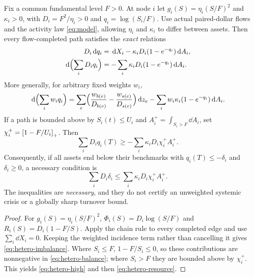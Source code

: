 \documentclass[review,hidelinks,onefignum,onetabnum]{siamonline250211}%
\begin{document}
\begin{proposition}
\label{prop:hetero-weighted}
Fix a common fundamental level $F>0$. At node $i$ let
$g_i(S)=\eta_i(S/F)^2$ and $\kappa_i>0$, with
$D_i=F^2/\eta_i>0$ and $q_i=\log(S_i/F)$. Use actual paired-dollar
flows and the activity law \eqref{eq:model}, allowing $\eta_i$ and
$\kappa_i$ to differ between assets. Then every flow-completed path
satisfies the \emph{exact} relations
\begin{align}
 D_i\,\mathrm{d} q_i&=\,\mathrm{d} X_i-\kappa_iD_i(1-e^{-q_i})\,\mathrm{d} A_i,
 \label{eq:hetero-node}\\
 \,\mathrm{d}\Bigl(\sum_i D_i q_i\Bigr)
 &=-\sum_i\kappa_iD_i(1-e^{-q_i})\,\mathrm{d} A_i.
 \label{eq:hetero-balance}
\end{align}
More generally, for arbitrary fixed weights $w_i$,
\begin{equation}\label{eq:hetero-imbalance}
 \,\mathrm{d}\Bigl(\sum_iw_iq_i\Bigr)
 =\sum_e\Bigl(\frac{w_{b(e)}}{D_{b(e)}}
                  -\frac{w_{s(e)}}{D_{s(e)}}\Bigr)\,\mathrm{d} z_e
 -\sum_i w_i\kappa_i(1-e^{-q_i})\,\mathrm{d} A_i.
\end{equation}
If a path is bounded above by $S_i(t)\le U_i$ and
$A_i^+=\int_{S_i>F}\dd A_i$, set
$\chi_i^+=\left[1-F/U_i\right]_+$. Then
\begin{equation}\label{eq:hetero-high}
 \sum_iD_iq_i(T)\ge
 -\sum_i\kappa_iD_i\chi_i^+A_i^+.
\end{equation}
Consequently, if all assets end below their benchmarks with
$q_i(T)\le-\delta_i$ and $\delta_i\ge0$, a necessary condition is
\begin{equation}\label{eq:hetero-resource}
 \sum_iD_i\delta_i
 \le\sum_i\kappa_iD_i\chi_i^+A_i^+.
\end{equation}
The inequalities are \emph{necessary}, and they do not certify an
unweighted systemic crisis or a globally sharp turnover bound.
\end{proposition}
\begin{proof}
For $g_i(S)=\eta_i(S/F)^2$,
$\Phi_i(S)=D_i\log(S/F)$ and
$R_i(S)=D_i(1-F/S)$. Apply the chain rule to every
completed edge and use $\sum_i\dd X_i=0$. Keeping the
weighted incidence term rather than cancelling it gives
\eqref{eq:hetero-imbalance}. Where $S_i\le F$,
$1-F/S_i\le0$, so these contributions are nonnegative in
\eqref{eq:hetero-balance}; where $S_i>F$ they are bounded
above by $\chi_i^+$. This yields \eqref{eq:hetero-high} and
then \eqref{eq:hetero-resource}.
\end{proof}
\end{document}
